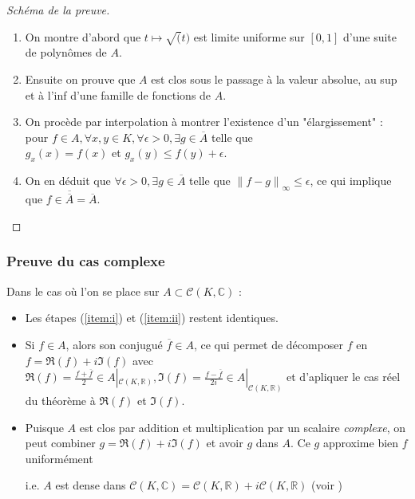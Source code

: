 \documentclass[
	10pt, %
]{beamer}
\begin{document}
\begin{frame}
\begin{proof}[Schéma de la preuve]
	\begin{enumerate}
		\item On montre d'abord que \( t \mapsto \sqrt(t) \) est limite uniforme sur \( [0,1] \) d'une suite de polynômes de \( A \). \label{item:i}
		\item Ensuite on prouve que \( A \) est clos sous le passage à la valeur absolue, au sup et à l'inf d'une famille de fonctions de \( A \). \label{item:ii}
		\item On procède par interpolation à montrer l'existence d'un "élargissement" : pour \( f \in A, \forall x,y \in K, \forall \epsilon > 0, \exists g \in \overline{A} \) telle que \\\( g_{x}(x) = f(x) \) et \( g_{x}(y) \leq f(y) + \epsilon \). \label{item:iii}
		\item On en déduit que \( \forall\epsilon > 0, \exists g \in \overline{A} \) telle que \( {\left\lVert f-g \right\rVert_{\infty}} \le \epsilon \), ce qui implique que \( f \in \overline{\overline{A}} = \overline{A} \). \label{item:iv}
	\end{enumerate}	
\end{proof}
\end{frame}


\begin{frame}
	\frametitle{Preuve du cas complexe}
\par Dans le cas où l'on se place sur \( A \subset \mathcal{C}(K,\mathbb{C}) \) :
\begin{itemize}
	\item Les étapes (\ref{item:i}) et (\ref{item:ii}) restent identiques.
	\item Si \( f \in A \), alors son conjugué \( \overline{f} \in A \), ce qui permet de décomposer \( f \) en \( f = \Re(f) + i\Im(f) \) avec \( \Re(f) = \frac{f + \overline{f}}{2}\in A|_{\mathcal{C}(K,\mathbb{R})}, \Im(f) = \frac{f - \overline{f}}{2i} \in A|_{\mathcal{C}(K,\mathbb{R})} \) et d'apliquer le cas réel du théorème à \( \Re(f) \) et \( \Im(f) \).
	\item Puisque \( A \) est clos par addition et multiplication par un scalaire \textit{complexe}, on peut combiner \( g = \Re(f) + i\Im(f) \) et avoir \( g \) dans \( A \). Ce \( g \) approxime bien \( f \) uniformément 
		
		i.e. \( A \) est dense dans \( \mathcal{C}(K,\mathbb{C}) = \mathcal{C}(K,\mathbb{R}) + i\mathcal{C}(K,\mathbb{R}) \) (voir \cite{stephenson1968spaces})

\end{itemize}
\end{frame}
\end{document}
